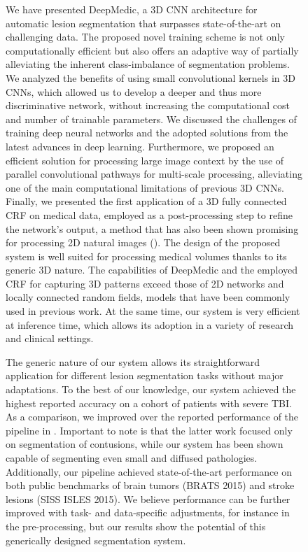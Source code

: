\documentclass[preprint,authoryear,12pt]{elsarticle}
\begin{document}
\begin{figure}[h]
We have presented DeepMedic, a 3D CNN architecture for automatic lesion segmentation that surpasses state-of-the-art on challenging data. The proposed novel training scheme is not only computationally efficient but also offers an adaptive way of partially alleviating the inherent class-imbalance of segmentation problems. We analyzed the benefits of using small convolutional kernels in 3D CNNs, which allowed us to develop a deeper and thus more discriminative network, without increasing the computational cost and number of trainable parameters. We discussed the challenges of training deep neural networks and the adopted solutions from the latest advances in deep learning. Furthermore, we proposed an efficient solution for processing large image context by the use of parallel convolutional pathways for multi-scale processing, alleviating one of the main computational limitations of previous 3D CNNs. Finally, we presented the first application of a 3D fully connected CRF on medical data, employed as a post-processing step to refine the network's output, a method that has also been shown promising for processing 2D natural images (\cite{chen2014semantic}). The design of the proposed system is well suited for processing medical volumes thanks to its generic 3D nature. The capabilities of DeepMedic and the employed CRF for capturing 3D patterns exceed those of 2D networks and locally connected random fields, models that have been commonly used in previous work. At the same time, our system is very efficient at inference time, which allows its adoption in a variety of research and clinical settings.

The generic nature of our system allows its straightforward application for different lesion segmentation tasks without major adaptations. To the best of our knowledge, our system achieved the highest reported accuracy on a cohort of patients with severe TBI. As a comparison, we improved over the reported performance of the pipeline in \cite{Rao2014b}. Important to note is that the latter work focused only on segmentation of contusions, while our system has been shown capable of segmenting even small and diffused pathologies. Additionally, our pipeline achieved state-of-the-art performance on both public benchmarks of brain tumors (BRATS 2015) and stroke lesions (SISS ISLES 2015). We believe performance can be further improved with task- and data-specific adjustments, for instance in the pre-processing, but our results show the potential of this generically designed segmentation system.


\end{figure}
\end{document}
